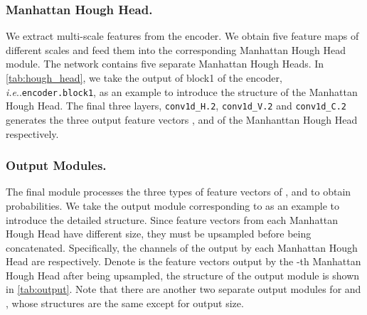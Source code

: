 \documentclass[runningheads]{llncs}
\makeatletter
\DeclareRobustCommand\onedot{\futurelet\@let@token\@onedot}
\def\@onedot{\ifx\@let@token.\else.\null\fi\xspace}
\def\ie{\emph{i.e}\onedot} \def\Ie{\emph{I.e}\onedot}
\makeatother
\begin{document}
\subsubsection{Manhattan Hough Head.}
We extract multi-scale features from the encoder. We obtain five feature maps of different scales and feed them into the corresponding Manhattan Hough Head module.
The network contains five separate Manhattan Hough Heads.
In \cref{tab:hough_head}, we take the output of block1 of the encoder, \ie \texttt{encoder.block1}, as an example to introduce the structure of the Manhattan Hough Head. The final three layers, \texttt{conv1d\_H.2}, \texttt{conv1d\_V.2} and \texttt{conv1d\_C.2} generates the three output feature vectors ,  and  of the Manhanttan Hough Head respectively.


\subsubsection{Output Modules.}
The final module processes the three types of feature vectors of ,  and  to obtain probabilities. We take the output module corresponding to  as an example to introduce the detailed structure.
Since feature vectors from each Manhattan Hough Head have different size, they must be upsampled before being concatenated. Specifically, the channels of the output by each Manhattan Hough Head are  respectively. Denote  is the  feature vectors output by the -th Manhattan Hough Head after being upsampled, the structure of the output module is shown in \cref{tab:output}. Note that there are 
another two separate output modules for  and 
, whose structures are the same except for output size. 
\end{document}
